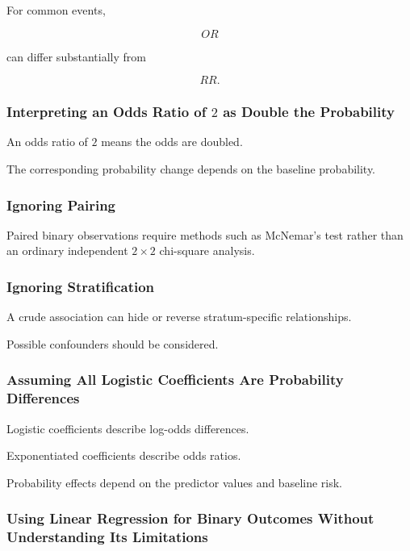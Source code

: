 For common events,

\[
OR
\]

can differ substantially from

\[
RR.
\]

\subsubsection{Interpreting an Odds Ratio of \(2\) as Double the Probability}

An odds ratio of \(2\) means the odds are doubled.

The corresponding probability change depends on the baseline
probability.

\subsubsection{Ignoring Pairing}

Paired binary observations require methods such as McNemar's test rather
than an ordinary independent \(2\times2\) chi-square analysis.

\subsubsection{Ignoring Stratification}

A crude association can hide or reverse stratum-specific relationships.

Possible confounders should be considered.

\subsubsection{Assuming All Logistic Coefficients Are Probability Differences}

Logistic coefficients describe log-odds differences.

Exponentiated coefficients describe odds ratios.

Probability effects depend on the predictor values and baseline risk.

\subsubsection{Using Linear Regression for Binary Outcomes Without Understanding Its Limitations}

